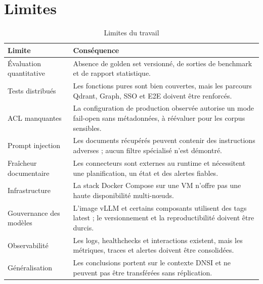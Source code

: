 \section{Limites}
\begin{table}[H]
\centering
\caption{Limites du travail}
\label{tab:limits_ch8}
\begin{tabular}{p{4.0cm}p{9.5cm}}
\toprule
\textbf{Limite} & \textbf{Conséquence} \\
\midrule
Évaluation quantitative & Absence de golden set versionné, de sorties de benchmark et de rapport statistique. \\
Tests distribués & Les fonctions pures sont bien couvertes, mais les parcours Qdrant, Graph, SSO et E2E doivent être renforcés. \\
ACL manquantes & La configuration de production observée autorise un mode fail-open sans métadonnées, à réévaluer pour les corpus sensibles. \\
Prompt injection & Les documents récupérés peuvent contenir des instructions adverses ; aucun filtre spécialisé n’est démontré. \\
Fraîcheur documentaire & Les connecteurs sont externes au runtime et nécessitent une planification, un état et des alertes fiables. \\
Infrastructure & La stack Docker Compose sur une VM n’offre pas une haute disponibilité multi-nœuds. \\
Gouvernance des modèles & L’image vLLM et certains composants utilisent des tags latest ; le versionnement et la reproductibilité doivent être durcis. \\
Observabilité & Les logs, healthchecks et interactions existent, mais les métriques, traces et alertes doivent être consolidées. \\
Généralisation & Les conclusions portent sur le contexte DNSI et ne peuvent pas être transférées sans réplication. \\
\bottomrule
\end{tabular}
\end{table}

